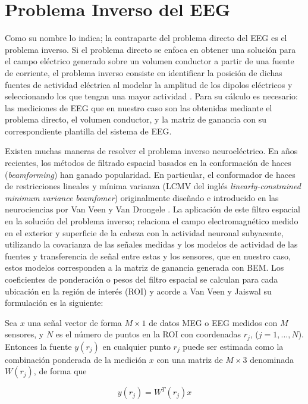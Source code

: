 \section{Problema Inverso del EEG}
\label{sec:intro:inverse}

Como su nombre lo indica; la contraparte del problema directo del EEG es el problema inverso. Si el problema directo se enfoca en obtener una solución para el campo eléctrico generado sobre un volumen conductor a partir de una fuente de corriente, el problema inverso consiste en identificar la posición de dichas fuentes de actividad eléctrica al modelar la amplitud de los dipolos eléctricos y seleccionando los que tengan una mayor actividad \cite{Baillet2001}. Para su cálculo es necesario: las mediciones de EEG que en nuestro caso son las obtenidas mediante el problema directo, el volumen conductor, y la matriz de ganancia con su correspondiente plantilla del sistema de EEG.

Existen muchas maneras de resolver el problema inverso neuroeléctrico. En años recientes, los métodos de filtrado espacial basados en la conformación de haces (\emph{beamforming}) han ganado popularidad. En particular, el conformador de haces de restricciones lineales y mínima varianza (LCMV del inglés \emph{linearly-constrained minimum variance beamfomer}) originalmente diseñado e introducido en las neurociencias por Van Veen y Van Drongele \cite{VanVeen1988, VanVeen1997}. La aplicación de este filtro espacial en la solución del problema inverso; relaciona el campo electromagnético medido en el exterior y superficie de la cabeza con la actividad neuronal subyacente, utilizando la covarianza de las señales medidas y los modelos de actividad de las fuentes y transferencia de señal entre estas y los sensores, que en nuestro caso, estos modelos corresponden a la matriz de ganancia generada con BEM. Los coeficientes de ponderación o pesos del filtro espacial se calculan para cada ubicación en la región de interés (ROI) y acorde a Van Veen y Jaiswal \cite{VanVeen1997,Jaiswal2020} su formulación es la siguiente:

Sea $x$ una señal vector de forma $M \times 1$ de datos MEG o EEG medidos con $M$ sensores, y $N$ es el número de puntos en la ROI con coordenadas $r_j$, ($j = 1, ..., N$). Entonces la fuente $y(r_j)$ en cualquier punto $r_j$ puede ser estimada como la combinación ponderada de la medición $x$ con una matriz de $M \times 3$ denominada $W(r_j)$, de forma que

\begin{equation}
	\label{beamformer}
y(r_j) = W^{T}(r_j)x
\end{equation}

